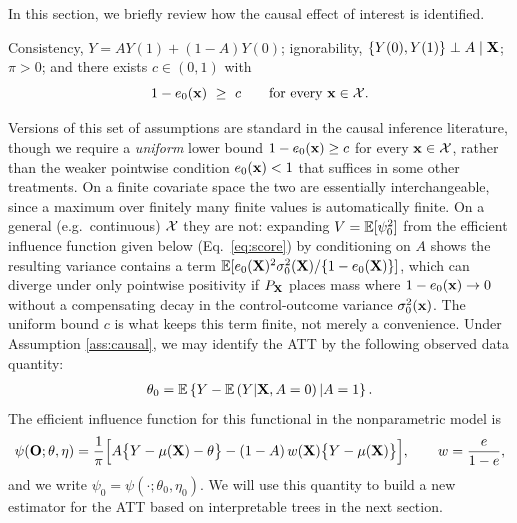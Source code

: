 \documentclass[12pt]{article}
\begin{document}
In this section, we briefly review how the causal effect of interest is identified. 

\begin{assumption}\label{ass:causal}
Consistency, $Y=AY(1)+(1-A)Y(0)$; ignorability,
$\{Y(0),Y(1)\}\perp A\mid \mathbf{X}$; $\pi>0$; and there exists $c\in(0,1)$ with
\[
  1-e_0(\mathbf{x})\ \ge\ c \qquad\text{for every }\mathbf{x}\in\mathcal{X} .
\]
\end{assumption}

Versions of this set of assumptions are standard in the causal inference literature, though we require a \emph{uniform} lower bound $1-e_0(\mathbf{x})\ge c$ for every $\mathbf{x}\in\mathcal{X}$, rather than the weaker pointwise condition $e_0(\mathbf{x})<1$ that suffices in some other treatments. On a finite covariate space the two are essentially interchangeable, since a maximum over finitely many finite values is automatically finite. On a general (e.g.\ continuous) $\mathcal{X}$ they are not: expanding $V=\mathbb{E}[\psi_0^2]$ from the efficient influence function given below (Eq.~\eqref{eq:score}) by conditioning on $A$ shows the resulting variance contains a term $\mathbb{E}[e_0(\mathbf{X})^2\sigma_0^2(\mathbf{X})/\{1-e_0(\mathbf{X})\}]$, which can diverge under only pointwise positivity if $P_{\mathbf{X}}$ places mass where $1-e_0(\mathbf{x})\to0$ without a compensating decay in the control-outcome variance $\sigma_0^2(\mathbf{x})$. The uniform bound $c$ is what keeps this term finite, not merely a convenience. Under Assumption \ref{ass:causal}, we may identify the ATT by the following observed data quantity:
\begin{align}
\label{eq:att-id}
	\theta_0 = \mathbb{E}\left\{Y - \mathbb{E}\left(Y | \mathbf{X}, A = 0\right) | A = 1\right\}.
\end{align}
The efficient influence function for this functional in the nonparametric model is
\citep{hahn1998}
\begin{equation}\label{eq:score}
  \psi(\mathbf{O};\theta,\eta)
  =\frac1\pi\Bigl[A\bigl\{Y-\mu(\mathbf{X})-\theta\bigr\}
   -(1-A)\,w(\mathbf{X})\bigl\{Y-\mu(\mathbf{X})\bigr\}\Bigr],
  \qquad w=\frac e{1-e},
\end{equation}
and we write $\psi_0=\psi(\cdot;\theta_0,\eta_0)$. We will use this quantity to build a new estimator for the ATT based on interpretable trees in the next section.
\end{document}
